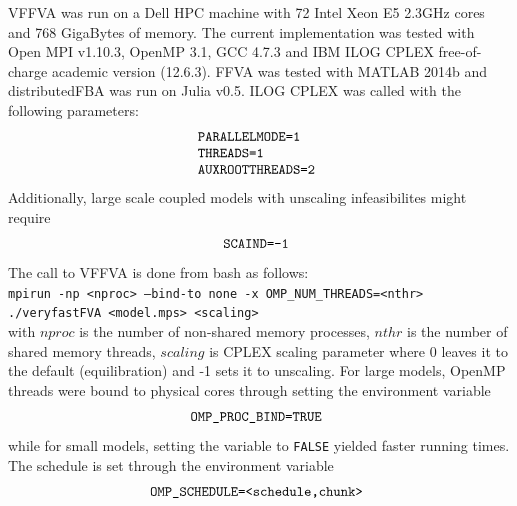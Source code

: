 \documentclass[letterpaper, 10 pt, conference]{ieeeconf}  %
\begin{document}
VFFVA was run on a Dell HPC machine with 72 Intel Xeon E5 2.3GHz cores and 768 GigaBytes of memory. The current implementation was tested with Open MPI v1.10.3, OpenMP 3.1, GCC 4.7.3 and IBM ILOG CPLEX free-of-charge academic version (12.6.3). FFVA was tested with MATLAB 2014b and distributedFBA was run on Julia v0.5. ILOG CPLEX was called with the following parameters:
\begin{equation*} \label{eq:one}
\begin{array}{ll@{}ll}
\texttt{PARALLELMODE=1} &\\
\texttt{THREADS=1} &\\
\texttt{AUXROOTTHREADS=2} &\\
\end{array}
\end{equation*}
Additionally, large scale coupled models with unscaling infeasibilites might require 
\begin{equation*} \label{eq:one}
\begin{array}{ll@{}ll}
\texttt{SCAIND=-1} &\\
\end{array}
\end{equation*}
The call to VFFVA is done from bash as follows:\\
\texttt{mpirun -np \textless nproc\textgreater \hspace{0.1cm}  --bind-to none -x OMP\_NUM\_THREADS=\textless nthr\textgreater \hspace{0.1cm} ./veryfastFVA \textless model.mps\textgreater \hspace{0.1cm} \textless scaling\textgreater}\\
with $nproc$ is the number of non-shared memory processes, $nthr$ is the number of shared memory threads, $scaling$ is CPLEX scaling parameter where 0 leaves it to the default (equilibration) and -1 sets it to unscaling. For large models, OpenMP threads were bound to physical cores through setting the environment variable 
\begin{equation*} \label{eq:one}
\begin{array}{ll@{}ll}
\texttt{OMP\_PROC\_BIND=TRUE} &\\
\end{array}
\end{equation*}
while for small models, setting the variable to \texttt{FALSE}  yielded faster running times.
The schedule is set through the environment variable
\begin{equation*} \label{eq:one}
\begin{array}{ll@{}ll}
\texttt{OMP\_SCHEDULE=<schedule,chunk>} &\\
\end{array}
\end{equation*}
\end{document}
